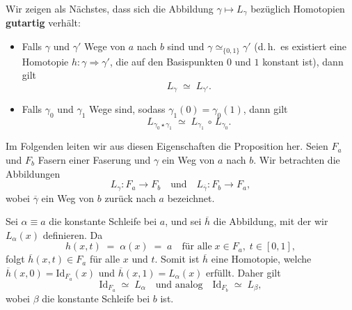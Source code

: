 \documentclass[12pt]{article}
\numberwithin{conj}{section}
\begin{document}
                
                Wir zeigen als Nächstes, dass sich die Abbildung \(\gamma \mapsto L_\gamma\) bezüglich Homotopien \cite[Prop.~4.61]{hatcher2001} \textbf{gutartig} verhält:
                \begin{itemize}[noitemsep]
                    \item Falls \(\gamma\) und \(\gamma'\) Wege von \(a\) nach \(b\) sind und
                          \(\gamma \simeq_{\{0,1\}} \gamma'\)
                          (d.\,h.\ es existiert eine Homotopie \(h : \gamma \Rightarrow \gamma'\), die auf den Basispunkten \(0\) und \(1\) konstant ist), dann gilt
                          \[
                            L_\gamma \;\simeq\; L_{\gamma'}.
                          \]
                    \item Falls \(\gamma_0\) und \(\gamma_1\) Wege sind, sodass \(\gamma_1(0) = \gamma_0(1)\), dann gilt
                          \[
                            L_{\gamma_0 \star \gamma_1}
                            \;\simeq\;
                            L_{\gamma_1} \,\circ\, L_{\gamma_0}.
                          \]
                \end{itemize}
                Im Folgenden leiten wir aus diesen Eigenschaften die Proposition her. Seien \(F_a\) und \(F_b\) Fasern einer Faserung und \(\gamma\) ein Weg von \(a\) nach \(b\). Wir betrachten die Abbildungen
                \[
                    L_\gamma : F_a \longrightarrow F_b
                    \quad\text{und}\quad
                    L_{\overline{\gamma}} : F_b \longrightarrow F_a,
                \]
                wobei \(\overline{\gamma}\) ein Weg von \(b\) zurück nach \(a\) bezeichnet.
                
                \smallskip
                
                Sei \(\alpha \equiv a\) die konstante Schleife bei \(a\), und sei \(\overline{h}\) die Abbildung, mit der wir \(L_\alpha(x)\) definieren. Da
                \[
                    h(x,t) \;=\; \alpha(x) \;=\; a
                    \quad\text{für alle}\;
                    x\in F_a,\; t\in [0,1],
                \]
                folgt \(\overline{h}(x,t) \in F_a\) für alle \(x\) und \(t\). Somit ist \(\overline{h}\) eine Homotopie, welche \(\overline{h}(x,0) = \mathrm{Id}_{F_a}(x)\) und \(\overline{h}(x,1) = L_\alpha(x)\) erfüllt. Daher gilt
                \[
                    \mathrm{Id}_{F_a}
                    \;\simeq\;
                    L_\alpha
                    \quad\text{und analog}\quad
                    \mathrm{Id}_{F_b}
                    \;\simeq\;
                    L_\beta,
                \]
                wobei \(\beta\) die konstante Schleife bei \(b\) ist.
                
\end{document}
